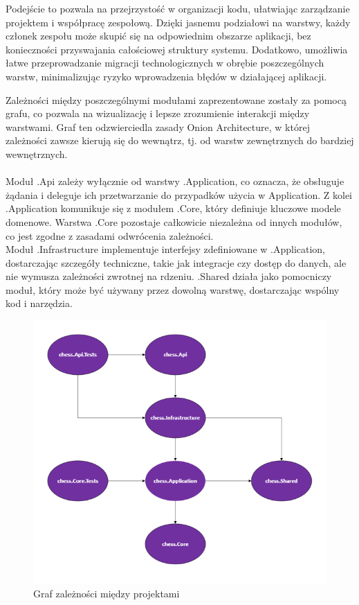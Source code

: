 \documentclass[12pt,a4paper]{article}
\begin{document}
\noindent
Podejście to pozwala na przejrzystość w organizacji kodu, ułatwiając zarządzanie projektem i współpracę zespołową. Dzięki jasnemu podziałowi na warstwy, każdy członek zespołu może skupić się na odpowiednim obszarze aplikacji, bez konieczności przyswajania całościowej struktury systemu. Dodatkowo, umożliwia łatwe przeprowadzanie migracji technologicznych w obrębie poszczególnych warstw, minimalizując ryzyko wprowadzenia błędów w działającej aplikacji.

\newpage

\noindent
Zależności między poszczególnymi modułami zaprezentowane zostały za pomocą grafu, co pozwala na wizualizację i lepsze zrozumienie interakcji między warstwami. Graf ten odzwierciedla zasady Onion Architecture, w której zależności zawsze kierują się do wewnątrz, tj. od warstw zewnętrznych do bardziej wewnętrznych.
\\\\
Moduł .Api zależy wyłącznie od warstwy .Application, co oznacza, że obsługuje żądania i deleguje ich przetwarzanie do przypadków użycia w Application. Z kolei .Application komunikuje się z modułem .Core, który definiuje kluczowe modele domenowe. Warstwa .Core pozostaje całkowicie niezależna od innych modułów, co jest zgodne z zasadami odwrócenia zależności.
\\
Moduł .Infrastructure implementuje interfejsy zdefiniowane w .Application, dostarczając szczegóły techniczne, takie jak integracje czy dostęp do danych, ale nie wymusza zależności zwrotnej na rdzeniu. .Shared działa jako pomocniczy moduł, który może być używany przez dowolną warstwę, dostarczając wspólny kod i narzędzia.

\begin{figure}[h!]
    \centering
    \includegraphics[width=1\textwidth]{images/diagram_dependencies.png}
    \caption{Graf zależności między projektami}
\end{figure}
\end{document}
